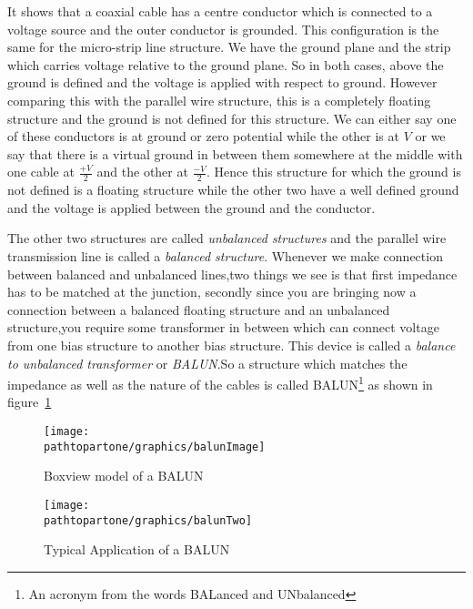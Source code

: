 It shows that a coaxial cable has a centre conductor which is connected to a voltage source and the outer conductor is grounded. This configuration is the same for the micro-strip line structure. We have the ground plane and the strip which carries voltage relative to the ground plane. So in both cases, above the ground is defined and the voltage is applied with respect to ground. However comparing this with the parallel wire structure, this is a completely floating structure and the ground is not defined for this structure. We can either say one of these conductors is at ground or zero potential while the other is at $V$ or we say that there is a virtual ground in between them somewhere at the middle with one cable at $\frac{+V}{2}$ and the other at $\frac{-V}{2}$. Hence this structure for which the ground is not defined is a floating structure while the other two have a well defined ground and the voltage is applied between the ground and the conductor.

The other two structures are called \emph{unbalanced structures} and the parallel wire transmission line is called a \emph{balanced structure}. Whenever we make connection between balanced and unbalanced lines,two things we see is that first impedance has to be matched at the junction, secondly since you are bringing now a connection between a balanced floating structure and an unbalanced structure,you require some transformer in between which can connect voltage from one bias structure to another bias structure. This device is called a \emph{balance to unbalanced transformer} or \emph{BALUN}.So a structure which matches the impedance as well as the nature of the cables is called BALUN\footnote{
An acronym from the words BALanced and UNbalanced
} as shown in figure~\ref{fig:balunImage}
\begin{figure}[h]
\centering
\texttt{[image: \\pathtopartone/graphics/balunImage]}
\caption{Boxview model of a BALUN}
\label{fig:balunImage}
\end{figure}
\begin{figure}[h]
\centering
\texttt{[image: \\pathtopartone/graphics/balunTwo]}
\caption{Typical Application of a BALUN}
\label{fig:balunTwo}
\end{figure}

